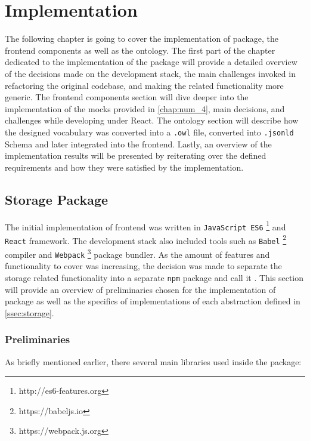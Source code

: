 \chapter{Implementation}
\label{chap:num_5}

The following chapter is going to cover the implementation of \lpas{} package, the frontend components as well as the ontology. The first part of the chapter dedicated to the implementation of the package will provide a detailed overview of the decisions made on the development stack, the main challenges invoked in refactoring the original \lpa{} codebase, and making the \solid{} related functionality more generic. The frontend components section will dive deeper into the implementation of the mocks provided in \autoref{chap:num_4}, main decisions, and challenges while developing under React. The ontology section  will describe how the designed \lpas{} vocabulary was converted into a \texttt{.owl} file, converted into \texttt{.jsonld} Schema and later integrated into the \lpa{} frontend. Lastly, an overview of the implementation results will be presented by reiterating over the defined \lpa{} requirements and how they were satisfied by the implementation.
 
\section{Storage Package}

The initial implementation of \lpa{} frontend was written in \texttt{JavaScript ES6} \footnote{http://es6-features.org} and \texttt{React} framework. The development stack also included tools such as \texttt{Babel} \footnote{https://babeljs.io} compiler and \texttt{Webpack} \footnote{https://webpack.js.org} package bundler. As the amount of features and functionality to cover was increasing, the decision was made to separate the \solid{} storage related functionality into a separate \texttt{npm} package and call it \lpas{}. This section will provide an overview of preliminaries chosen for the implementation of \lpas{} package as well as the specifics of implementations of each abstraction defined in \autoref{ssec:storage}. 

\subsection{Preliminaries}

As briefly mentioned earlier, there several main libraries used inside the \lpas{} package:

